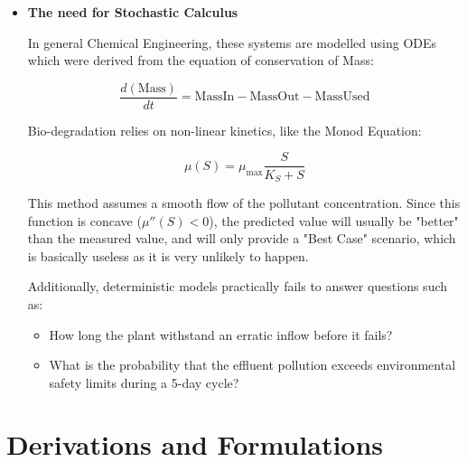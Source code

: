 \documentclass[conference]{IEEEtran}
\renewcommand{\bigskip}{\vspace{2\baselineskip}}
\renewcommand{\medskip}{\vspace{1\baselineskip}}
\renewcommand{\smallskip}{\vspace{0.5\baselineskip}}
\theoremstyle{definitionsc}
\theoremstyle{plainsc}
\theoremstyle{remarksc}
\begin{document}
\begin{itemize}
\begin{itemize}
	\item\textbf{Tank 2}
	
	This is the fixed volume tank which contains the live bacteria. It receives the stream from tank 1 and does the bio breakdown.
\end{itemize}


\item \textbf{The need for Stochastic Calculus}

In general Chemical Engineering, these systems are modelled using ODEs which were derived from the equation of conservation of Mass:

\begin{equation*}
	\frac{d(\text{Mass})}{dt} = \text{MassIn} - \text{MassOut} - \text{MassUsed}
\end{equation*}

\smallskip

Bio-degradation relies on non-linear kinetics, like the Monod Equation:

\begin{equation*}
	\mu(S) = \mu_{\text{max}}\frac{S}{K_{S}+S}
\end{equation*}

\smallskip

This method assumes a smooth flow of the pollutant concentration. Since this function is concave ($\mu''(S)<0$), the predicted value will usually be "better" than the measured value, and will only provide a "Best Case" scenario, which is basically useless as it is very unlikely to happen.

\medskip

Additionally, deterministic models practically fails to answer questions such as:

\begin{itemize}
	\item How long the plant withstand an erratic inflow before it fails?
	\item What is the probability that the effluent pollution exceeds environmental safety limits during a 5-day cycle?
\end{itemize}


\end{itemize}

\bigskip










\section{Derivations and Formulations}
\end{document}
